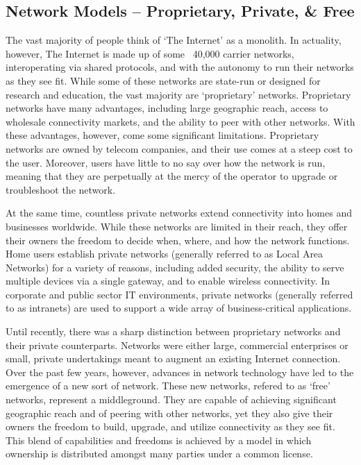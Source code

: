 \subsection{Network Models -- Proprietary, Private, \& Free}
The vast majority of people think of `The Internet' as a monolith. In
actuality, however, The Internet is made up of some ~40,000 carrier networks,
interoperating via shared protocols, and with the autonomy to run their networks
as they see fit. While some of these networks are state-run or designed for
research and education, the vast majority are `proprietary' networks.
Proprietary networks have many advantages, including large
geographic reach, access to wholesale connectivity markets, and the ability to
peer with other networks. With these advantages, however, come some significant
limitations. Proprietary networks are owned by telecom companies, and their use
comes at a steep cost to the user. Moreover, users have little to no say over
how the network is run, meaning that they are perpetually at the mercy of the
operator to upgrade or troubleshoot the network. \par
At the same time, countless private networks extend connectivity 
into homes and businesses worldwide. While these networks are limited in their
reach, they offer their owners the freedom to decide when, where, and how the network functions.
Home users  establish private networks (generally referred to as Local Area
Networks) for a variety of reasons, including
added security, the ability to serve multiple devices via a single gateway, and
to enable wireless connectivity. In corporate and public sector IT environments, 
private networks (generally referred to as intranets) are used to support a wide 
array of business-critical applications. \par  
Until recently, there was a sharp distinction between proprietary networks and their
private counterparts. Networks were either large, commercial enterprises or
small, private undertakings meant to augment an existing Internet connection.
Over the past few years, however, advances in network technology have led to the
emergence of a new sort of network. These new networks, refered to as `free'
networks, represent a middleground. They are capable of achieving significant
geographic reach and of peering with other networks, yet they also give their
owners the freedom to build, upgrade, and utilize connectivity as they see fit. 
This blend of capabilities and freedoms is achieved by a model in which
ownership is distributed amongst many parties under a common license.\par
